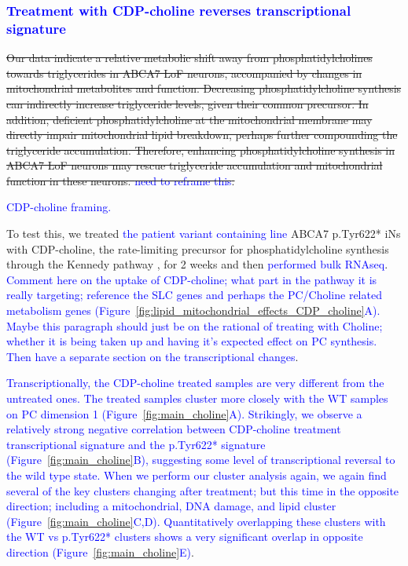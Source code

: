 \subsubsection{\textcolor{blue}{Treatment with CDP-choline reverses transcriptional signature}}
\sout{Our data indicate a relative metabolic shift away from phosphatidylcholines towards triglycerides in  ABCA7 LoF neurons, accompanied by changes in mitochondrial metabolites and function. Decreasing phosphatidylcholine synthesis can indirectly increase triglyceride levels, given their common precursor\cite{Farese2023-bb}.  In addition, deficient phosphatidylcholine at the mitochondrial membrane may directly impair mitochondrial lipid breakdown, perhaps further compounding the triglyceride accumulation\cite{Schuler2016-tr,Szymkowicz2019-be,Mejia2015-tw,Prola2021-uz}. Therefore, enhancing phosphatidylcholine synthesis in ABCA7 LoF neurons may rescue triglyceride accumulation and mitochondrial function in these neurons. \textcolor{blue}{need to reframe this}.}

\textcolor{blue}{CDP-choline framing.}

To test this, we treated \textcolor{blue}{the patient variant containing line} ABCA7 p.Tyr622* iNs with CDP-choline, the rate-limiting precursor for phosphatidylcholine synthesis through the Kennedy pathway \cite{Zeisel2009-xv,Son2024-tu}, for 2 weeks and then \textcolor{blue}{performed bulk RNAseq}. \textcolor{blue}{Comment here on the uptake of CDP-choline; what part in the pathway it is really targeting; reference the SLC genes and perhaps the PC/Choline related metabolism genes (Figure~\ref{fig:lipid_mitochondrial_effects_CDP_choline}A). Maybe this paragraph should just be on the rational of treating with Choline; whether it is being taken up and having it's expected effect on PC synthesis. Then have a separate section on the transcriptional changes}.

\textcolor{blue}{Transcriptionally, the CDP-choline treated samples are very different from the untreated ones. The treated samples cluster more closely with the WT samples on PC dimension 1 (Figure~\ref{fig:main_choline}A). Strikingly, we observe a relatively strong negative correlation between CDP-choline treatment transcriptional signature and the p.Tyr622* signature (Figure~\ref{fig:main_choline}B), suggesting some level of transcriptional reversal to the wild type state. When we perform our cluster analysis again, we again find several of the key clusters changing after treatment; but this time in the opposite direction; including a mitochondrial, DNA damage, and lipid cluster (Figure~\ref{fig:main_choline}C,D). Quantitatively overlapping these clusters with the WT vs p.Tyr622* clusters shows a very significant overlap in opposite direction (Figure~\ref{fig:main_choline}E)}.

